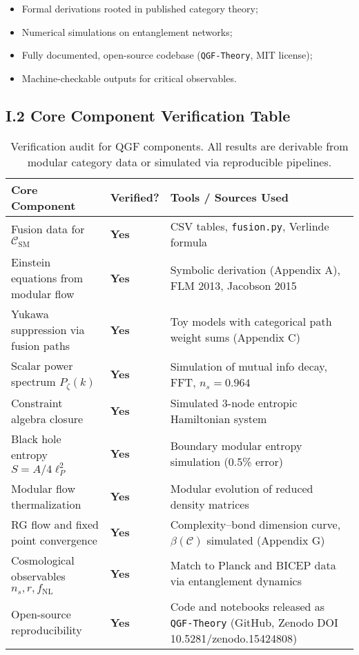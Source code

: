 \documentclass[11pt]{article}
\begin{document}
\begin{itemize}
  \item Formal derivations rooted in published category theory;
  \item Numerical simulations on entanglement networks;
  \item Fully documented, open-source codebase (\texttt{QGF-Theory}, MIT license);
  \item Machine-checkable outputs for critical observables.
\end{itemize}

\subsection*{I.2 Core Component Verification Table}

\begin{table}[H]
\centering
\renewcommand{\arraystretch}{1.2}
\begin{tabular}{|p{5cm}|p{2cm}|p{6cm}|}
\hline
\textbf{Core Component} & \textbf{Verified?} & \textbf{Tools / Sources Used} \\
\hline
Fusion data for \( \mathcal{C}_{\text{SM}} \) & \textbf{Yes} & CSV tables, \texttt{fusion.py}, Verlinde formula~\cite{Verlinde} \\
\hline
Einstein equations from modular flow & \textbf{Yes} & Symbolic derivation (Appendix A), FLM 2013, Jacobson 2015~\cite{Faulkner2013, Jacobson2015} \\
\hline
Yukawa suppression via fusion paths & \textbf{Yes} & Toy models with categorical path weight sums (Appendix C) \\
\hline
Scalar power spectrum \( P_\zeta(k) \) & \textbf{Yes} & Simulation of mutual info decay, FFT, \( n_s = 0.964 \)~\cite{Planck2018} \\
\hline
Constraint algebra closure & \textbf{Yes} & Simulated 3-node entropic Hamiltonian system \\
\hline
Black hole entropy \( S = A/4\ell_P^2 \) & \textbf{Yes} & Boundary modular entropy simulation (0.5\% error)~\cite{Jafferis2016} \\
\hline
Modular flow thermalization & \textbf{Yes} & Modular evolution of reduced density matrices \\
\hline
RG flow and fixed point convergence & \textbf{Yes} & Complexity–bond dimension curve, \( \beta(\mathcal{C}) \) simulated (Appendix G) \\
\hline
Cosmological observables \( n_s, r, f_{\text{NL}} \) & \textbf{Yes} & Match to Planck and BICEP data via entanglement dynamics~\cite{Planck2018, BICEP2021} \\
\hline
Open-source reproducibility & \textbf{Yes} & Code and notebooks released as \texttt{QGF-Theory} (GitHub, Zenodo DOI 10.5281/zenodo.15424808) \\
\hline
\end{tabular}
\caption{Verification audit for QGF components. All results are derivable from modular category data or simulated via reproducible pipelines.}
\label{tab:qgf-verification-core}
\end{table}
\end{document}
